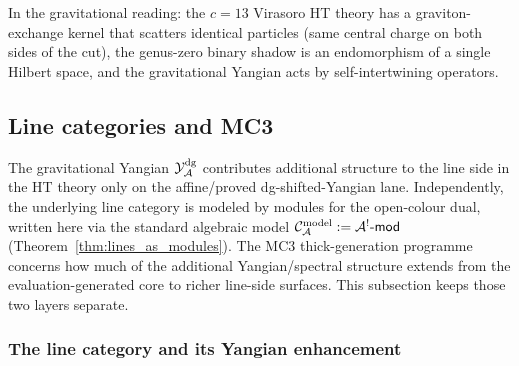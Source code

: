 \begin{remark}
In the gravitational reading: the $c = 13$ Virasoro HT theory
has a graviton-exchange kernel that scatters identical particles
(same central charge on both sides of the cut), the genus-zero
binary shadow is an endomorphism of a single Hilbert space, and
the gravitational Yangian acts by self-intertwining operators.
\end{remark}


%
%

\subsection{Line categories and MC3}

The gravitational Yangian $\mathcal{Y}^{\mathrm{dg}}_{\mathcal{A}}$ contributes additional structure
to the line side in the HT theory only on the affine/proved
dg-shifted-Yangian lane. Independently, the underlying line category
is modeled by modules for the open-colour dual, written here via the
standard algebraic model
$\mathcal{C}_{\mathcal{A}}^{\mathrm{model}} := \mathcal{A}^!\text{-}\mathsf{mod}$
\textup{(}Theorem~\textup{\ref{thm:lines_as_modules})}. The MC3
thick-generation programme concerns how much of the additional
Yangian/spectral structure extends from the evaluation-generated core
to richer line-side surfaces. This subsection keeps those two layers
separate.


\subsubsection{The line category and its Yangian enhancement}

